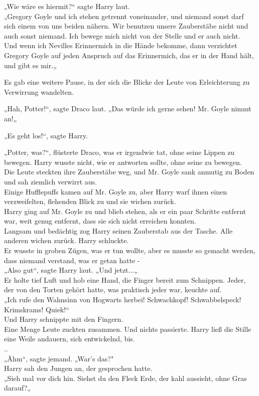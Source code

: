 {„Wie wäre es hiermit?“ sagte Harry laut.\\ „Gregory Goyle und ich stehen getrennt voneinander, und niemand sonst darf sich einem von uns beiden nähern. Wir benutzen unsere Zauberstäbe nicht und auch sonst niemand. Ich bewege mich nicht von der Stelle und er auch nicht.\\ Und wenn ich Nevilles Erinnermich in die Hände bekomme, dann verzichtet Gregory Goyle auf jeden Anspruch auf das Erinnermich, das er in der Hand hält, und gibt es mir.„

Es gab eine weitere Pause, in der sich die Blicke der Leute von Erleichterung zu Verwirrung wandelten.

„Hah, Potter!“, sagte Draco laut. „Das würde ich gerne sehen! Mr. Goyle nimmt an!„

„Es geht los!“, sagte Harry.

„Potter, was?“, flüsterte Draco, was er irgendwie tat, ohne seine Lippen zu bewegen. Harry wusste nicht, wie er antworten sollte, ohne seine zu bewegen.\\ Die Leute steckten ihre Zauberstäbe weg, und Mr. Goyle sank anmutig zu Boden und sah ziemlich verwirrt aus.\\ Einige Hufflepuffs kamen auf Mr. Goyle zu, aber Harry warf ihnen einen\\ verzweifelten, flehenden Blick zu und sie wichen zurück.\\ Harry ging auf Mr. Goyle zu und blieb stehen, als er ein paar Schritte entfernt war, weit genug entfernt, dass sie sich nicht erreichen konnten.\\ Langsam und bedächtig zog Harry seinen Zauberstab aus der Tasche. Alle anderen wichen zurück. Harry schluckte.\\ Er wusste in groben Zügen, was er tun wollte, aber es musste so gemacht werden, dass niemand verstand, was er getan hatte -\\ „Also gut“, sagte Harry laut. „Und jetzt...„\\ Er holte tief Luft und hob eine Hand, die Finger bereit zum Schnippen. Jeder, der von den Torten gehört hatte, was praktisch jeder war, keuchte auf.\\ „Ich rufe den Wahnsinn von Hogwarts herbei! Schwachkopf! Schwabbelspeck! Krimskrams! Quiek!“\\ Und Harry schnippte mit den Fingern.\\ Eine Menge Leute zuckten zusammen. Und nichts passierte. Harry ließ die Stille eine Weile andauern, sich entwickelnd, bis.\\ ..\\ „Ähm“, sagte jemand. „War's das?"\\ Harry sah den Jungen an, der gesprochen hatte.\\ „Sieh mal vor dich hin. Siehst du den Fleck Erde, der kahl aussieht, ohne Gras darauf?„

}
